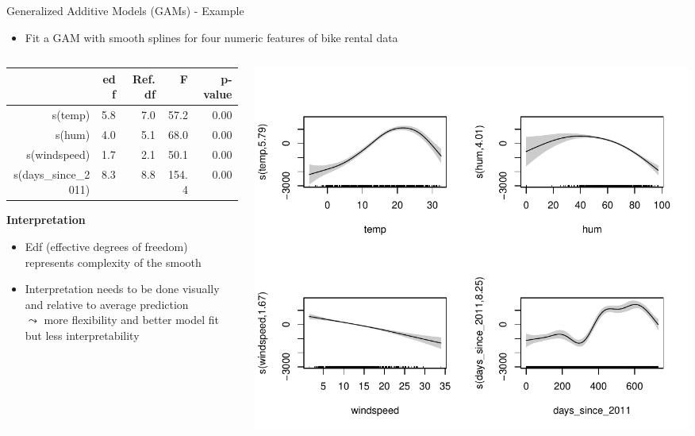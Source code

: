 \documentclass[11pt,compress,t,notes=noshow, aspectratio=169, xcolor=table]{beamer}
\begin{document}
\begin{frame}{Generalized Additive Models (GAMs) - Example}
    \begin{itemize}
    \item Fit a GAM with smooth splines for four numeric features of bike rental data 
\end{itemize}

\begin{columns}[T]
\begin{column}{0.45\textwidth}
\begin{table}[ht]
\centering
\tiny
\begin{tabular}{rrrrr}
  \hline
 & edf & Ref.df & F & p-value \\ 
  \hline
s(temp) & 5.8 & 7.0 & 57.2 & 0.00 \\ 
  s(hum) & 4.0 & 5.1 & 68.0 & 0.00 \\ 
  s(windspeed) & 1.7 & 2.1 & 50.1 & 0.00 \\ 
  s(days\_since\_2011) & 8.3 & 8.8 & 154.4 & 0.00 \\ 
   \hline
\end{tabular}
\end{table}


\textbf{Interpretation}
\begin{itemize}
    \item Edf (effective degrees of freedom) represents complexity of the smooth
    \item Interpretation needs to be done visually and relative to average prediction\\
    $\leadsto$ more flexibility and better model fit but less interpretability
\end{itemize}
\end{column}
\hfill
\begin{column}{0.5\textwidth}
\includegraphics[width = \textwidth]{figure/gam_effects.pdf}
\end{column}
\end{columns}
\end{frame}
\end{document}
